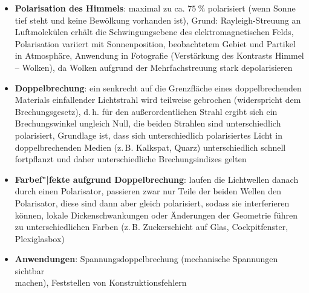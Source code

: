 \linie
\begin{itemize}
    \item
    \textbf{Polarisation des Himmels}:
    maximal zu ca. $\SI{75}{\percent}$ polarisiert
    (wenn Sonne tief steht und keine Bewölkung vorhanden ist),
    Grund: Rayleigh-Streuung an Luftmolekülen erhält die Schwingungsebene
    des elektromagnetischen Felds,
    Polarisation variiert mit Sonnenposition, beobachtetem Gebiet und
    Partikel in Atmosphäre,
    Anwendung in Fotografie (Verstärkung des Kontrasts Himmel -- Wolken),
    da Wolken aufgrund der Mehrfachstreuung stark depolarisieren
\end{itemize}
\linie
\pagebreak
\begin{itemize}
    \item
    \textbf{Doppelbrechung}:
    ein senkrecht auf die Grenzfläche eines doppelbrechenden Materials
    einfallender Lichtstrahl wird teilweise gebrochen (widerspricht dem
    Brechungsgesetz), d.\,h. für den außerordentlichen Strahl ergibt sich
    ein Brechungswinkel ungleich Null, die beiden Strahlen sind unterschiedlich
    polarisiert,
    Grundlage ist, dass sich unterschiedlich polarisiertes Licht in
    doppelbrechenden Medien (z.\,B. Kalkspat, Quarz) unterschiedlich schnell
    fortpflanzt und daher unterschiedliche Brechungsindizes gelten

    \item
    \textbf{Farbef"|fekte aufgrund Doppelbrechung}:
    laufen die Lichtwellen danach durch einen Polarisator, passieren zwar nur
    Teile der beiden Wellen den Polarisator, diese sind dann aber gleich
    polarisiert, sodass sie interferieren können,
    lokale Dickenschwankungen oder Änderungen der Geometrie führen zu
    unterschiedlichen Farben
    (z.\,B. Zuckerschicht auf Glas, Cockpitfenster, Plexiglasbox)

    \item
    \textbf{Anwendungen}:
    Spannungsdoppelbrechung (mechanische Spannungen sichtbar\\
    machen), Feststellen von Konstruktionsfehlern
\end{itemize}
\linie
